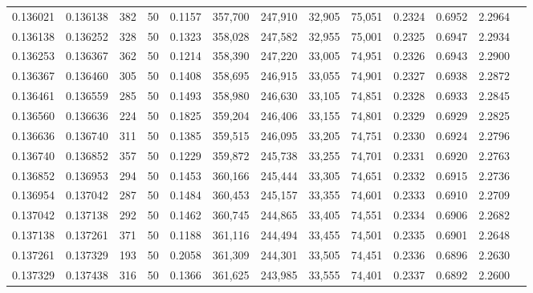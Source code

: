\begin{tabular}{rrrrrrrrrrrrr}
0.136021 & 0.136138 &   382 &  50 &                                     0.1157 & 357,700 & 247,910 &  32,905 &  75,051 & 0.2324 & 0.6952 & 2.2964 \\
0.136138 & 0.136252 &   328 &  50 &                                     0.1323 & 358,028 & 247,582 &  32,955 &  75,001 & 0.2325 & 0.6947 & 2.2934 \\
0.136253 & 0.136367 &   362 &  50 &                                     0.1214 & 358,390 & 247,220 &  33,005 &  74,951 & 0.2326 & 0.6943 & 2.2900 \\
0.136367 & 0.136460 &   305 &  50 &                                     0.1408 & 358,695 & 246,915 &  33,055 &  74,901 & 0.2327 & 0.6938 & 2.2872 \\
0.136461 & 0.136559 &   285 &  50 &                                     0.1493 & 358,980 & 246,630 &  33,105 &  74,851 & 0.2328 & 0.6933 & 2.2845 \\
0.136560 & 0.136636 &   224 &  50 &                                     0.1825 & 359,204 & 246,406 &  33,155 &  74,801 & 0.2329 & 0.6929 & 2.2825 \\
0.136636 & 0.136740 &   311 &  50 &                                     0.1385 & 359,515 & 246,095 &  33,205 &  74,751 & 0.2330 & 0.6924 & 2.2796 \\
0.136740 & 0.136852 &   357 &  50 &                                     0.1229 & 359,872 & 245,738 &  33,255 &  74,701 & 0.2331 & 0.6920 & 2.2763 \\
0.136852 & 0.136953 &   294 &  50 &                                     0.1453 & 360,166 & 245,444 &  33,305 &  74,651 & 0.2332 & 0.6915 & 2.2736 \\
0.136954 & 0.137042 &   287 &  50 &                                     0.1484 & 360,453 & 245,157 &  33,355 &  74,601 & 0.2333 & 0.6910 & 2.2709 \\
0.137042 & 0.137138 &   292 &  50 &                                     0.1462 & 360,745 & 244,865 &  33,405 &  74,551 & 0.2334 & 0.6906 & 2.2682 \\
0.137138 & 0.137261 &   371 &  50 &                                     0.1188 & 361,116 & 244,494 &  33,455 &  74,501 & 0.2335 & 0.6901 & 2.2648 \\
0.137261 & 0.137329 &   193 &  50 &                                     0.2058 & 361,309 & 244,301 &  33,505 &  74,451 & 0.2336 & 0.6896 & 2.2630 \\
0.137329 & 0.137438 &   316 &  50 &                                     0.1366 & 361,625 & 243,985 &  33,555 &  74,401 & 0.2337 & 0.6892 & 2.2600 \\

\end{tabular}
